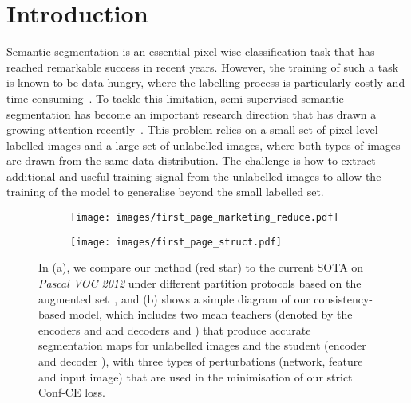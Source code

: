 \documentclass[10pt,twocolumn,letterpaper]{article}
\begin{document}
\section{Introduction}
\label{sec:intro}

Semantic segmentation is an essential pixel-wise classification task that has reached remarkable success in recent years. However, the training of such a task is known to be data-hungry, where the labelling process is particularly costly and time-consuming~\cite{ouali2020semi}. To tackle this limitation, semi-supervised semantic segmentation has become an important research direction that has drawn a growing attention recently~\cite{ouali2020semi, chen2021semi, ke2020guided}. 
This problem relies on a small set of pixel-level labelled images and a large set of unlabelled images, where both types of images are drawn from the same data distribution. 
The challenge is how to extract additional and useful training signal from the unlabelled images to allow the training of the model to generalise beyond the small labelled set.


\begin{figure}[t] 
    \centering
    \begin{subfigure}[b]{0.47\linewidth}
         \centering    
            \texttt{[image: images/first\_page\_marketing\_reduce.pdf]}
\end{subfigure}
        \begin{subfigure}[b]{0.49\linewidth}
         \centering     \texttt{[image: images/first\_page\_struct.pdf]}
\end{subfigure}
    \caption{In (a), we compare our method (red star) to the current SOTA on \textit{Pascal VOC 2012} under different partition protocols based on the augmented set~\cite{hariharan2011semantic}, and (b) shows a simple diagram of our consistency-based model, which includes two mean teachers (denoted by the encoders  and  and decoders  and ) that produce accurate segmentation maps for unlabelled images  and the student (encoder  and decoder ), with three types of perturbations (network, feature and input image) that are used in the minimisation of our strict Conf-CE loss.\vspace{-11pt}}
\label{fig: brief_talk}
\end{figure}
\end{document}
